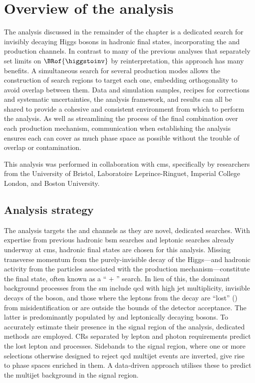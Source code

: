 \section{Overview of the analysis}
\label{sec:htoinv_analysis_overview}

The analysis discussed in the remainder of the chapter is a dedicated search for invisibly decaying Higgs bosons in hadronic final states, incorporating the \ttH and \VH production channels. In contrast to many of the previous analyses that separately set limits on $\BRof{\higgstoinv}$ by reinterpretation, this approach has many benefits. A simultaneous search for several production modes allows the construction of search regions to target each one, embedding orthogonality to avoid overlap between them. Data and simulation samples, recipes for corrections and systematic uncertainties, the analysis framework, and results can all be shared to provide a cohesive and consistent environment from which to perform the analysis. As well as streamlining the process of the final combination over each production mechanism, communication when establishing the analysis ensures each can cover as much phase space as possible without the trouble of overlap or contamination.

This analysis was performed in collaboration with \acrshort{cms}, specifically by researchers from the University of Bristol, Laboratoire Leprince-Ringuet, Imperial College London, and Boston University.




\subsection{Analysis strategy}
\label{subsec:htoinv_analysis_strategy}

The analysis targets the \ttH and \VH channels as they are novel, dedicated searches. With expertise from previous hadronic \acrshort{bsm} searches and leptonic \higgstoinv searches already underway at \acrshort{cms}, hadronic final states are chosen for this analysis. Missing transverse momentum from the purely-invisible decay of the Higgs---and hadronic activity from the particles associated with the production mechanism---constitute the final state, often known as a `` $+$ \ptvecmiss'' search. In lieu of this, the dominant background processes from the \acrlong{sm} include \acrshort{qcd} with high \gls{jet} multiplicity, invisible decays of the \PZ boson, and those where the leptons from the decay are ``lost'' (\lostlepton) from misidentification or are outside the bounds of the detector acceptance. The latter is predominantly populated by \ttbar and leptonically decaying \PW bosons. To accurately estimate their presence in the signal region of the analysis, dedicated methods are employed. \Glspl{CR} separated by lepton and photon requirements predict the lost lepton and \ztonunu processes. Sidebands to the signal region, where one or more selections otherwise designed to reject \acrshort{qcd} multijet events are inverted, give rise to phase spaces enriched in them. A data-driven approach utilises these to predict the multijet background in the signal region.

